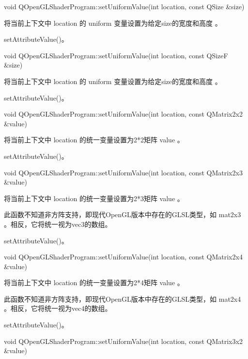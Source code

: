 void QOpenGLShaderProgram::setUniformValue(int location, const QSize \&size)

将当前上下文中 location 的 uniform 变量设置为给定size的宽度和高度 。

\begin{seeAlso}
setAttributeValue()。
\end{seeAlso}

void QOpenGLShaderProgram::setUniformValue(int location, const QSizeF \&size)

将当前上下文中 location 的 uniform 变量设置为给定size的宽度和高度 。

\begin{seeAlso}
setAttributeValue()。
\end{seeAlso}

void QOpenGLShaderProgram::setUniformValue(int location, const QMatrix2x2 \&value)

将当前上下文中 location 的统一变量设置为2*2矩阵 value 。


\begin{seeAlso}
setAttributeValue()。
\end{seeAlso}

void QOpenGLShaderProgram::setUniformValue(int location, const QMatrix2x3 \&value)

将当前上下文中 location 的统一变量设置为2*3矩阵 value 。

\begin{notice}
此函数不知道非方阵支持，即现代OpenGL版本中存在的GLSL类型，如 mat2x3 。相反，它将统一视为vec3的数组。
\end{notice}

\begin{seeAlso}
setAttributeValue()。
\end{seeAlso}

void QOpenGLShaderProgram::setUniformValue(int location, const QMatrix2x4 \&value)

将当前上下文中 location 的统一变量设置为2*4矩阵 value 。

\begin{notice}
此函数不知道非方阵支持，即现代OpenGL版本中存在的GLSL类型，如 mat2x4 。相反，它将统一视为vec4的数组。
\end{notice}

\begin{seeAlso}
setAttributeValue()。
\end{seeAlso}

void QOpenGLShaderProgram::setUniformValue(int location, const QMatrix3x2 \&value)

